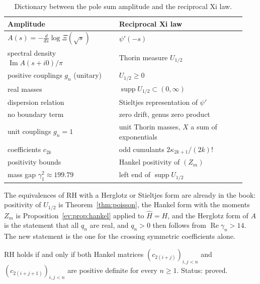 \begin{table}[ht]
\centering
\footnotesize
\begin{tabular}{@{}p{0.44\linewidth}p{0.5\linewidth}@{}}
\toprule
Amplitude & Reciprocal Xi law \\
\midrule
$A(s)=-\tfrac{d}{ds}\log\Xi(\sqrt s)$ & $\psi'(-s)$ \\
spectral density $\operatorname{Im}A(s+i0)/\pi$ & Thorin measure $U_{1/2}$ \\
positive couplings $g_n$ (unitary) & $U_{1/2}\ge0$ \\
real masses & $\operatorname{supp}U_{1/2}\subset(0,\infty)$ \\
dispersion relation & Stieltjes representation of $\psi'$ \\
no boundary term & zero drift, genus zero product \\
unit couplings $g_n=1$ & unit Thorin masses, $X$ a sum of exponentials \\
coefficients $c_{2k}$ & odd cumulants $2\kappa_{2k+1}/(2k)!$ \\
positivity bounds & Hankel positivity of $(Z_m)$ \\
mass gap $\gamma_1^2\approx199.79$ & left end of $\operatorname{supp}U_{1/2}$ \\
\bottomrule
\end{tabular}
\caption{Dictionary between the pole sum amplitude and the reciprocal Xi law.}
\label{ev:tab:ampdict}
\end{table}

The equivalences of RH with a Herglotz or Stieltjes form are already in the book: positivity of $U_{1/2}$ is Theorem~\ref{thm:poisson}, the Hankel form with the moments $Z_m$ is Proposition~\ref{ev:prop:hankel} applied to $\widehat H=H$, and the Herglotz form of $A$ is the statement that all $q_n$ are real, and $q_n>0$ then follows from $\operatorname{Re}\gamma_n>14$. The new statement is the one for the crossing symmetric coefficients alone.

\begin{theorem}\label{ev:thm:amp}
RH holds if and only if both Hankel matrices $(c_{2(i+j)})_{i,j<n}$ and $(c_{2(i+j+1)})_{i,j<n}$ are positive definite for every $n\ge1$. Status: proved.
\end{theorem}

